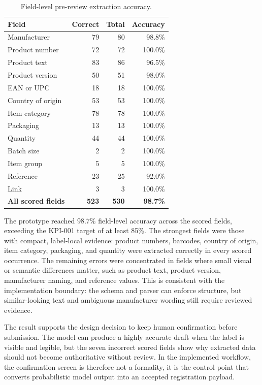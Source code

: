 \begin{table}[htbp]
\centering
\begin{tabular}{p{4cm} r r r}
\hline
\textbf{Field} & \textbf{Correct} & \textbf{Total} & \textbf{Accuracy} \\
\hline
Manufacturer & 79 & 80 & 98.8\% \\
Product number & 72 & 72 & 100.0\% \\
Product text & 83 & 86 & 96.5\% \\
Product version & 50 & 51 & 98.0\% \\
EAN or UPC & 18 & 18 & 100.0\% \\
Country of origin & 53 & 53 & 100.0\% \\
Item category & 78 & 78 & 100.0\% \\
Packaging & 13 & 13 & 100.0\% \\
Quantity & 44 & 44 & 100.0\% \\
Batch size & 2 & 2 & 100.0\% \\
Item group & 5 & 5 & 100.0\% \\
Reference & 23 & 25 & 92.0\% \\
Link & 3 & 3 & 100.0\% \\
\hline
\textbf{All scored fields} & \textbf{523} & \textbf{530} & \textbf{98.7\%} \\
\hline
\end{tabular}
\caption{Field-level pre-review extraction accuracy.}
\label{tab:kpi-extraction-accuracy}
\end{table}

The prototype reached 98.7\% field-level accuracy across the scored fields, exceeding the KPI-001 target of at least 85\%. The strongest fields were those with compact, label-local evidence: product numbers, barcodes, country of origin, item category, packaging, and quantity were extracted correctly in every scored occurrence. The remaining errors were concentrated in fields where small visual or semantic differences matter, such as product text, product version, manufacturer naming, and reference values. This is consistent with the implementation boundary: the schema and parser can enforce structure, but similar-looking text and ambiguous manufacturer wording still require reviewed evidence.

The result supports the design decision to keep human confirmation before submission. The model can produce a highly accurate draft when the label is visible and legible, but the seven incorrect scored fields show why extracted data should not become authoritative without review. In the implemented workflow, the confirmation screen is therefore not a formality, it is the control point that converts probabilistic model output into an accepted registration payload.

